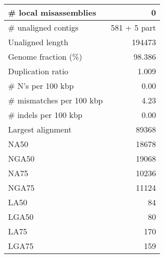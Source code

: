 \documentclass[12pt,a4paper]{article}
\begin{document}
\begin{table}[ht]
\begin{center}
\begin{tabular}{|l*{1}{|r}|}
\# local misassemblies & 0 \\ \hline
\# unaligned contigs & 581 + 5 part \\ \hline
Unaligned length & 194473 \\ \hline
Genome fraction (\%) & 98.386 \\ \hline
Duplication ratio & 1.009 \\ \hline
\# N's per 100 kbp & 0.00 \\ \hline
\# mismatches per 100 kbp & 4.23 \\ \hline
\# indels per 100 kbp & 0.00 \\ \hline
Largest alignment & 89368 \\ \hline
NA50 & 18678 \\ \hline
NGA50 & 19068 \\ \hline
NA75 & 10236 \\ \hline
NGA75 & 11124 \\ \hline
LA50 & 84 \\ \hline
LGA50 & 80 \\ \hline
LA75 & 170 \\ \hline
LGA75 & 159 \\ \hline
\end{tabular}
\end{center}
\end{table}
\end{document}
